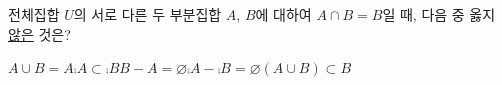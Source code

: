 전체집합 $U$의 서로 다른 두 부분집합 $A$, $B$에 대하여 $A\cap B=B$일 때, 다음 중 옳지 \underline{않은} 것은?
\begin{choices32}{$A\cup B=A$}{$\comp{A}\subset\comp{B}$}{$B-A=\varnothing$}{$\comp{A}-\comp{B}=\varnothing$}{$(A\cup B)\subset B$}\end{choices32}
